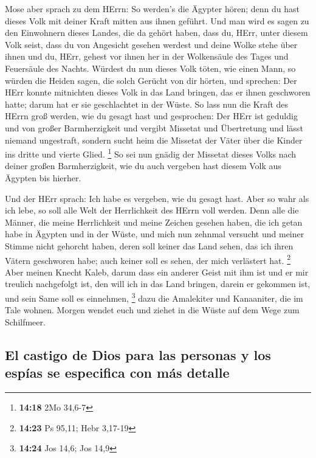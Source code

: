  Mose aber sprach zu dem HErrn: So werden's die Ägypter
hören; denn du hast dieses Volk mit deiner Kraft mitten aus ihnen
geführt.  Und man wird es sagen zu den Einwohnern dieses
Landes, die da gehört haben, dass du, HErr, unter diesem Volk seist,
dass du von Angesicht gesehen werdest und deine Wolke stehe über ihnen
und du, HErr, gehest vor ihnen her in der Wolkensäule des Tages und
Feuersäule des Nachts.  Würdest du nun dieses Volk töten,
wie einen Mann, so würden die Heiden sagen, die solch Gerücht von dir
hörten, und sprechen:  Der HErr konnte mitnichten dieses
Volk in das Land bringen, das er ihnen geschworen hatte; darum hat er
sie geschlachtet in der Wüste.  So lass nun die Kraft des
HErrn groß werden, wie du gesagt hast und gesprochen: 
Der HErr ist geduldig und von großer Barmherzigkeit und vergibt Missetat
und Übertretung und lässt niemand ungestraft, sondern sucht heim die
Missetat der Väter über die Kinder ins dritte und vierte Glied.
\footnote{\textbf{14:18} 2Mo 34,6-7}  So sei nun gnädig
der Missetat dieses Volks nach deiner großen Barmherzigkeit, wie du auch
vergeben hast diesem Volk aus Ägypten bis hierher.

 Und der HErr sprach: Ich habe es vergeben, wie du gesagt
hast.  Aber so wahr als ich lebe, so soll alle Welt der
Herrlichkeit des HErrn voll werden.  Denn alle die
Männer, die meine Herrlichkeit und meine Zeichen gesehen haben, die ich
getan habe in Ägypten und in der Wüste, und mich nun zehnmal versucht
und meiner Stimme nicht gehorcht haben,  deren soll
keiner das Land sehen, das ich ihren Vätern geschworen habe; auch keiner
soll es sehen, der mich verlästert hat. \footnote{\textbf{14:23} Ps
  95,11; Hebr 3,17-19}  Aber meinen Knecht Kaleb, darum
dass ein anderer Geist mit ihm ist und er mir treulich nachgefolgt ist,
den will ich in das Land bringen, darein er gekommen ist, und sein Same
soll es einnehmen, \footnote{\textbf{14:24} Jos 14,6; Jos 14,9}
 dazu die Amalekiter und Kanaaniter, die im Tale wohnen.
Morgen wendet euch und ziehet in die Wüste auf dem Wege zum Schilfmeer.

\hypertarget{el-castigo-de-dios-para-las-personas-y-los-espuxedas-se-especifica-con-muxe1s-detalle}{%
\subsection{El castigo de Dios para las personas y los espías se
especifica con más
detalle}\label{el-castigo-de-dios-para-las-personas-y-los-espuxedas-se-especifica-con-muxe1s-detalle}}

